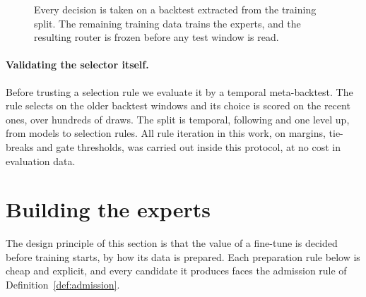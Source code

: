 \documentclass[11pt]{article}
\begin{document}
\begin{figure}[t]
\centering
{}
\caption{Every decision is taken on a backtest extracted from the training
split. The remaining training data trains the experts, and the resulting
router is frozen before any test window is read.}
\label{fig:protocol}
\end{figure}

\paragraph{Validating the selector itself.} Before trusting a selection
rule we evaluate it by a temporal meta-backtest. The rule selects on the
older backtest windows and its choice is scored on the recent ones, over
hundreds of draws. The split is temporal, following
\citet{bergmeir2012crossvalidation} and \citet{cerqueira2020evaluating}
one level up, from models to selection rules. All rule iteration in this
work, on margins, tie-breaks and gate thresholds, was carried out inside
this protocol, at no cost in evaluation data.

\section{Building the experts}
\label{sec:experts}

The design principle of this section is that the value of a fine-tune is
decided before training starts, by how its data is prepared. Each
preparation rule below is cheap and explicit, and every candidate it
produces faces the admission rule of Definition~\ref{def:admission}.
\end{document}
